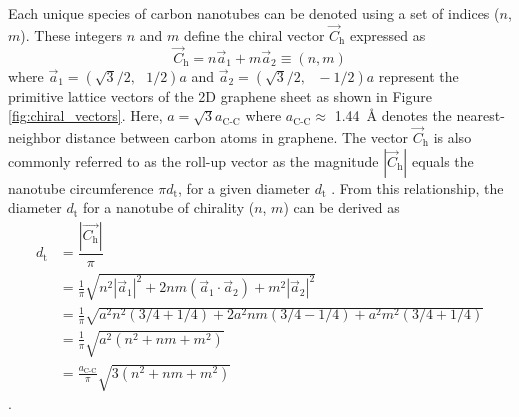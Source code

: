 Each unique species of carbon nanotubes can be denoted using a set of indices ($n$,$m$). These integers $n$ and $m$ define the chiral vector $\vec{C}_\text{h}$ expressed as
\begin{equation}
	\vec{C}_\text{h} = n \vec{a}_1 + m {\vec{a}_2} \equiv (n,m)
	\label{eq:chiral_vec}
\end{equation}
where $\vec{a}_\text{1} = (\sqrt{3}/2, \text{ }1/2) a$ and $\vec{a}_\text{2} = (\sqrt{3}/2, \text{ }-1/2)a$ represent the primitive lattice vectors of the 2D graphene sheet as shown in Figure \ref{fig:chiral_vectors}. Here, $a = \sqrt{3} a_\text{C-C}$ where $a_\text{C-C} \approx$ \SI{1.44}{\angstrom} denotes the nearest-neighbor distance between carbon atoms in graphene. The vector $\vec{C}_\text{h}$ is also commonly referred to as the roll-up vector as the magnitude $|\vec{C}_\text{h}|$ equals the nanotube circumference $\pi d_\text{t}$, for a given diameter $d_\text{t}$ \cite{nanot2013single}. From this relationship, the diameter $d_\text{t}$ for a nanotube of chirality ($n$, $m$) can be derived as
\begin{equation}
	\begin{split}
		d_\text{t} &= \dfrac{|\vec{C_\text{h}}|}{\pi} \\
		&= \frac{1}{\pi}\sqrt{ n^2 |\vec{a}_1|^2 + 2 n m (\vec{a}_1 \cdot \vec{a}_2) + m^2|\vec{a}_2|^2 }  \\
		&= \frac{1}{\pi}\sqrt{ a^2 n^2 (3/4 + 1/4 )+ 2 a^2 n m (3/4 - 1/4 ) + a^2 m^2 (3/4 + 1/4 ) } \\
		&= \frac{1}{\pi} \sqrt{ a^2 (n^2 + n m + m^2) }\\
		&= \frac{a_\text{C-C}}{\pi}\sqrt{3(n^2 + nm + m^2)}
	\end{split}
\end{equation}
.

